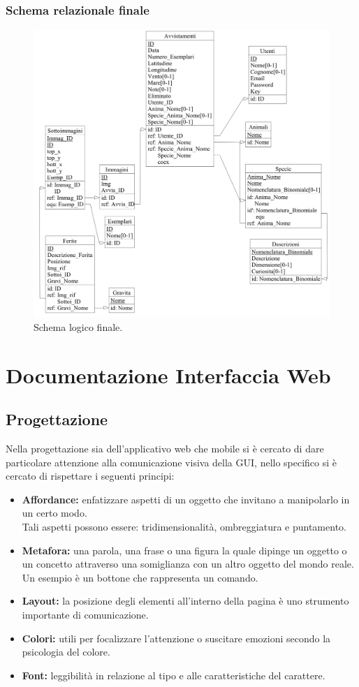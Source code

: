 \documentclass[a4paper,final,12pt]{report}
\begin{document}
\newpage
\subsection{Schema relazionale finale}
\begin{figure}[hbtp]
\centering
\includegraphics[scale=0.22]{img_concettuale/Logico.png}
\caption{Schema logico finale.}
\end{figure}

\chapter{Documentazione Interfaccia Web}

\section{Progettazione}
Nella progettazione sia dell'applicativo web che mobile si è cercato di dare particolare attenzione alla comunicazione visiva della GUI, nello specifico si è cercato di rispettare i seguenti principi:
\begin{itemize}
\item \textbf{Affordance:} enfatizzare aspetti di un oggetto che invitano a manipolarlo in un certo modo.\\ Tali aspetti possono essere: tridimensionalità, ombreggiatura e puntamento.
\item \textbf{Metafora:} una parola, una frase o una figura la quale dipinge un oggetto o un concetto attraverso una somiglianza con un altro oggetto del mondo reale. Un esempio è un bottone che rappresenta un comando.
\item \textbf{Layout:} 
la posizione degli elementi all'interno della pagina è uno strumento importante di comunicazione.
\item \textbf{Colori:} utili per focalizzare l'attenzione o suscitare emozioni secondo la psicologia del colore.
\item \textbf{Font:} leggibilità in relazione al tipo e alle caratteristiche del carattere.
\end{itemize}
\end{document}

